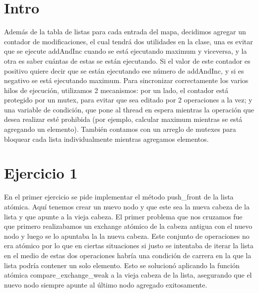 \section{Intro}
Además de la tabla de listas para cada entrada del mapa, decidimos agregar un contador de modificaciones, el cual tendrá dos utilidades en la clase, una es evitar que se ejecute addAndInc cuando se está ejecutando maximum y viceversa, y la otra es saber cuántas de estas se están ejecutando. Si el valor de este contador es positivo quiere decir que se están ejecutando ese número de addAndInc, y si es negativo se está ejecutando maximum. Para sincronizar correctamente los varios hilos de ejecución, utilizamos 2 mecanismos: por un lado, el contador está protegido por un mutex, para evitar que sea editado por 2 operaciones a la vez; y una variable de condición, que pone al thread en espera mientras la operación que desea realizar esté prohibida (por ejemplo, calcular maximum mientras se está agregando un elemento). También contamos con un arreglo de mutexes para bloquear cada lista individualmente mientras agregamos elementos.

\section{Ejercicio 1}
En el primer ejercicio se pide implementar el método push\_front de la lista atómica. Aquí tenemos crear un nuevo nodo y que este sea la nueva cabeza de la lista y que apunte a la vieja cabeza. El primer problema que nos cruzamos fue que primero realizabamos un exchange atómico de la cabeza antigua con el nuevo nodo y luego se lo apuntaba la la nueva cabeza. Este conjunto de operaciones no era atómico por lo que en ciertas situaciones si justo se intentaba de iterar la lista en el medio de estas dos operaciones habría una condición de carrera en la que la lista podría contener un solo elemento. Esto se solucionó aplicando la función atómica compare\_exchange\_weak a la vieja cabeza de la lista, asegurando que el nuevo nodo siempre apunte al último nodo agregado exitosamente.
